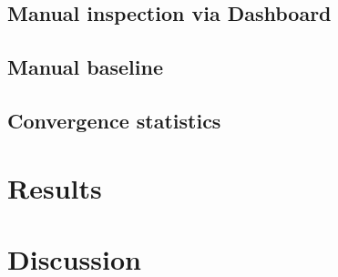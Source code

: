 \documentclass{article}
\begin{document}

\subsection{Manual inspection via Dashboard}
% 

\subsection{Manual baseline}

\subsection{Convergence statistics}

\section{Results}



\section{Discussion}




\end{document}
